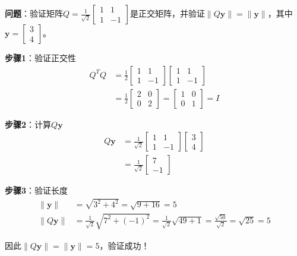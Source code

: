 \documentclass[12pt,a4paper]{article}
\begin{document}
\textbf{问题}：验证矩阵$Q = \frac{1}{\sqrt{2}} \begin{bmatrix} 1 & 1 \\ 1 & -1 \end{bmatrix}$是正交矩阵，并验证$\|Q\bm{y}\| = \|\bm{y}\|$，其中$\bm{y} = \begin{bmatrix} 3 \\ 4 \end{bmatrix}$。

\textbf{步骤1}：验证正交性
\begin{align}
Q^T Q &= \frac{1}{2} \begin{bmatrix} 1 & 1 \\ 1 & -1 \end{bmatrix} \begin{bmatrix} 1 & 1 \\ 1 & -1 \end{bmatrix} \\
&= \frac{1}{2} \begin{bmatrix} 2 & 0 \\ 0 & 2 \end{bmatrix} = \begin{bmatrix} 1 & 0 \\ 0 & 1 \end{bmatrix} = I
\end{align}

\textbf{步骤2}：计算$Q\bm{y}$
\begin{align}
Q\bm{y} &= \frac{1}{\sqrt{2}} \begin{bmatrix} 1 & 1 \\ 1 & -1 \end{bmatrix} \begin{bmatrix} 3 \\ 4 \end{bmatrix} \\
&= \frac{1}{\sqrt{2}} \begin{bmatrix} 7 \\ -1 \end{bmatrix}
\end{align}

\textbf{步骤3}：验证长度
\begin{align}
\|\bm{y}\| &= \sqrt{3^2 + 4^2} = \sqrt{9 + 16} = 5 \\
\|Q\bm{y}\| &= \frac{1}{\sqrt{2}} \sqrt{7^2 + (-1)^2} = \frac{1}{\sqrt{2}} \sqrt{49 + 1} = \frac{\sqrt{50}}{\sqrt{2}} = \sqrt{25} = 5
\end{align}

因此$\|Q\bm{y}\| = \|\bm{y}\| = 5$，验证成功！
\end{document}
